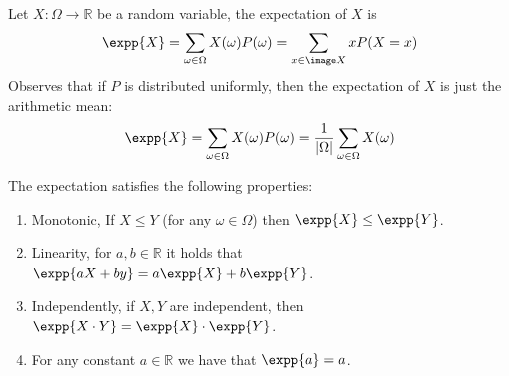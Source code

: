 \section{  }


\begin{definition}
  Let $X : \Omega\rightarrow \mathbb{R}$ be a random variable, the expectation of $X$ is 
  \begin{equation*}
    \begin{split}
      \expp{X} = \sum_{\omega\in \Omega}{X(\omega)P(\omega)} = \sum_{x \in \image X}{ x P(X = x)} 
    \end{split}
  \end{equation*}
  Observes that if $P$ is distributed uniformly, then the expectation of $X$ is just the arithmetic mean: 
\begin{equation*}
    \begin{split}
      \expp{X} = \sum_{\omega\in \Omega}{X(\omega)P(\omega)} =  \frac{1}{|\Omega|}\sum_{\omega\in \Omega}{X(\omega)}  
    \end{split}
  \end{equation*}
\end{definition}

\begin{claim}
   The expectation satisfies the following properties:
   \begin{enumerate}
     \item Monotonic, If $X \le Y$ (for any $\omega \in \Omega$) then $\expp{X} \le \expp{Y}$.   
     \item Linearity, for $a,b \in \mathbb{R}$ it holds that $\expp{aX + by} = a\expp{X} + b \expp{Y}$.   
     \item Independently, if $X,Y$ are independent, then $\expp{X\cdot Y} = \expp{X}\cdot \expp{Y}$.  
     \item For any constant $a \in \mathbb{R}$ we have that $\expp{a} = a$. 
   \end{enumerate}
\end{claim}

